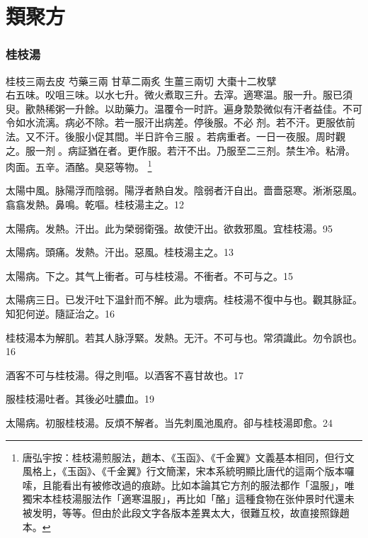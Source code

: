 





\tableofcontents
\mainmatter

\part{類聚方}

\section{桂枝湯}

桂枝{\scriptsize 三兩去皮} 芍藥{\scriptsize 三兩} 甘草{\scriptsize 二兩炙} 生薑{\scriptsize 三兩切} 大棗{\scriptsize 十二枚擘}\\
右五味。㕮咀三味。以水七升。微火煮取三升。去滓。適寒温。服一升。服已須臾。歠熱稀粥一升餘。以助藥力。温覆令一时許。遍身漐漐微似有汗者益佳。不可令如水流漓。病必不除。若一服汗出病差。停後服。不必{\sungii 𥁞}剂。若不汗。更服依前法。又不汗。後服小促其間。半日許令三服{\sungii 𥁞}。若病重者。一日一夜服。周时觀之。服一剂{\sungii 𥁞}。病証猶在者。更作服。若汗不出。乃服至二三剂。禁生冷。粘滑。肉面。五辛。酒酪。臭惡等物。{\zhaoben}
	\footnote{
		唐弘宇按：桂枝湯煎服法，趙本、《玉函》、《千金翼》文義基本相同，但行文風格上，《玉函》、《千金翼》行文簡潔，宋本系統明顯比唐代的這兩个版本囉嗦，且能看出有被修改過的痕跡。比如本論其它方剂的服法都作「温服」，唯獨宋本桂枝湯服法作「適寒温服」，再比如「酪」這種食物在张仲景时代還未被发明，等等。但由於此段文字各版本差異太大，很難互校，故直接照錄趙本。
	}

太陽中風。{\khaai 脉}陽浮而陰弱。陽浮者熱自发。陰弱者汗自出。嗇嗇惡寒。淅淅惡風。翕翕发熱。鼻鳴。乾嘔。桂枝湯主之。12

太陽病。发熱。汗出。此为榮弱衛强。故使汗出。欲救邪風。宜桂枝湯。95

太陽病。頭痛。发熱。汗出。惡風。桂枝湯主之。13

太陽病。下之。其气上衝者。可与桂枝湯。不衝者。不可与之。15

太陽病三日。已发汗吐下温針而不解。此为壞病。桂枝湯不復中与也。觀其脉証。知犯何逆。隨証治之。16

桂枝湯本为解肌。若其人脉浮緊。发熱。无汗。不可与也。常須識此。勿令誤也。16

酒客不可与桂枝湯。得之則嘔。以酒客不喜甘故也。17

服桂枝湯吐者。其後必吐膿血。19

太陽病。初服桂枝湯。反煩不解者。当先刺風池風府。卻与桂枝湯即愈。24

